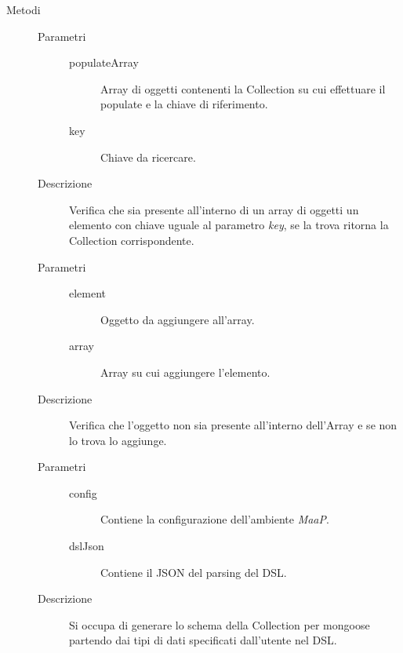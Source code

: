 \begin{description}
 \item[Metodi]
 \begin{mldescription}
  \hfill
 \begin{description}
      		\item[Parametri] \hfill
      			\begin{description}
      				\item[populateArray]
      				Array di oggetti contenenti la Collection su cui effettuare il populate e la chiave di riferimento.
      				\item[key]
      				Chiave da ricercare.
      			\end{description}
      		\item[Descrizione]
      		Verifica che sia presente all'interno di un array di oggetti un elemento con chiave uguale al parametro \textit{key}, se la trova ritorna la Collection corrispondente.
    \end{description}
  \hfill
 \begin{description}
      		\item[Parametri] \hfill
      			\begin{description}
      				\item[element]
      				Oggetto da aggiungere all'array.
      			   	\item[array]
      			   	Array su cui aggiungere l'elemento.
      			\end{description}
      		\item[Descrizione]
      		Verifica che l'oggetto non sia presente all'interno dell'Array e se non lo trova lo aggiunge.
    \end{description}
  \hfill
 \begin{description}
      		\item[Parametri] \hfill
      			\begin{description}
      				\item[config]
      				Contiene la configurazione dell'ambiente \textit{MaaP}.
      				\item[dslJson]
      				Contiene il JSON del parsing del DSL.
      			\end{description}
      		\item[Descrizione]
      		Si occupa di generare lo schema della Collection per mongoose partendo dai tipi di dati specificati dall'utente nel DSL.
      		
      		
      		
    \end{description}
 \end{mldescription}
 
\end{description}
